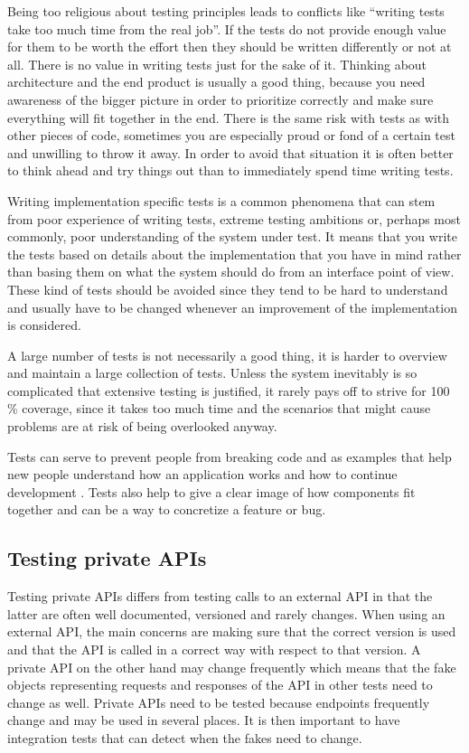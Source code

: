 \documentclass[11pt]{article}
\begin{document}
Being too religious about testing principles leads to conflicts like ``writing tests take too much time from the real job''. If the tests do not provide enough value for them to be worth the effort then they should be written differently or not at all. There is no value in writing tests just for the sake of it. Thinking about architecture and the end product is usually a good thing, because you need awareness of the bigger picture in order to prioritize correctly and make sure everything will fit together in the end. There is the same risk with tests as with other pieces of code, sometimes you are especially proud or fond of a certain test and unwilling to throw it away. In order to avoid that situation it is often better to think ahead and try things out than to immediately spend time writing tests. \cite[question~27]{Edelstam}

Writing implementation specific tests is a common phenomena that can stem from poor experience of writing tests, extreme testing ambitions or, perhaps most commonly, poor understanding of the system under test. It means that you write the tests based on details about the implementation that you have in mind rather than basing them on what the system should do from an interface point of view. These kind of tests should be avoided since they tend to be hard to understand and usually have to be changed whenever an improvement of the implementation is considered.

A large number of tests is not necessarily a good thing, it is harder to overview and maintain a large collection of tests. Unless the system inevitably is so complicated that extensive testing is justified, it rarely pays off to strive for 100 \% coverage, since it takes too much time and the scenarios that might cause problems are at risk of being overlooked anyway. \cite[question~28]{Edelstam}

Tests can serve to prevent people from breaking code and as examples that help new people understand how an application works and how to continue development \cite[questions~31-32]{Edelstam}. Tests also help to give a clear image of how components fit together and can be a way to concretize a feature or bug.

\subsection{Testing private APIs}

Testing private APIs differs from testing calls to an external API in that the latter are often well documented, versioned and rarely changes. When using an external API, the main concerns are making sure that the correct version is used and that the API is called in a correct way with respect to that version. A private API on the other hand may change frequently which means that the fake objects representing requests and responses of the API in other tests need to change as well. Private APIs need to be tested because endpoints frequently change and may be used in several places. It is then important to have integration tests that can detect when the fakes need to change. \cite[questions~34,~36]{Edelstam}
\end{document}
